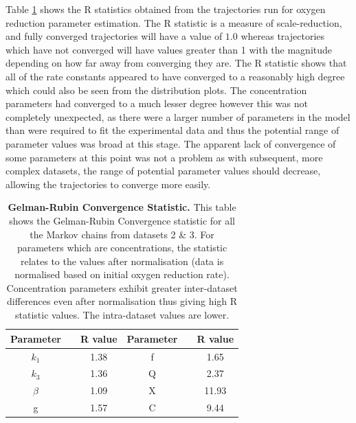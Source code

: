 Table \ref{tab:oxyRstat} shows the R statistics obtained from the trajectories run for oxygen reduction parameter estimation. The R statistic is a measure of scale-reduction, and fully converged trajectories will have a value of $1.0$ whereas trajectories which have not converged will have values greater than 1 with the magnitude depending on how far away from converging they are. The R statistic shows that all of the rate constants appeared to have converged to a reasonably high degree which could also be seen from the distribution plots. The concentration parameters had converged to a much lesser degree however this was not completely unexpected, as there were a larger number of parameters in the model than were required to fit the experimental data and thus the potential range of parameter values was broad at this stage. The apparent lack of convergence of some parameters at this point was not a problem as with subsequent, more complex datasets, the range of potential parameter values should decrease, allowing the trajectories to converge more easily.
\begin{table}[tbp]%
\renewcommand{\arraystretch}{1.5}
\begin{center}
\begin{tabular}{ccc|ccc}
\toprule
\textbf{Parameter} && \textbf{R value} & \textbf{Parameter} && \textbf{R value}\\
\midrule
$k_1$ && 1.38 & f && 1.65\\
$k_3$ && 1.36 & Q && 2.37\\
$\beta$ && 1.09 & X && 11.93\\
g && 1.57 & C && 9.44\\
\bottomrule
\end{tabular}
\end{center}
\caption[Gelman-Rubin Convergence Statistic]{{\bf Gelman-Rubin Convergence Statistic.} This table shows the Gelman-Rubin Convergence statistic for all the Markov chains from datasets 2 \& 3. For parameters which are concentrations, the statistic relates to the values after normalisation (data is normalised based on initial oxygen reduction rate). Concentration parameters exhibit greater inter-dataset differences even after normalisation thus giving high R statistic values. The intra-dataset values are lower.
\label{tab:oxyRstat}}
\end{table}

